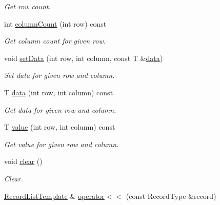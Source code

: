 \begin{DoxyCompactItemize}
\begin{DoxyCompactList}\small\item\em Get row count. \end{DoxyCompactList}\item 
int \hyperlink{class_mdt_1_1_plain_text_1_1_record_list_template_a59bfaf592d639840e2ce965b11185477}{column\+Count} (int row) const 
\begin{DoxyCompactList}\small\item\em Get column count for given row. \end{DoxyCompactList}\item 
void \hyperlink{class_mdt_1_1_plain_text_1_1_record_list_template_a53a8348c93099f99a8c53426c50e958b}{set\+Data} (int row, int column, const T \&\hyperlink{class_mdt_1_1_plain_text_1_1_record_list_template_a8bccf84419669f678d3f055d89fed002}{data})
\begin{DoxyCompactList}\small\item\em Set data for given row and column. \end{DoxyCompactList}\item 
T \hyperlink{class_mdt_1_1_plain_text_1_1_record_list_template_a8bccf84419669f678d3f055d89fed002}{data} (int row, int column) const 
\begin{DoxyCompactList}\small\item\em Get data for given row and column. \end{DoxyCompactList}\item 
T \hyperlink{class_mdt_1_1_plain_text_1_1_record_list_template_ac009f422a8f6b82f3633e2629c32ca52}{value} (int row, int column) const 
\begin{DoxyCompactList}\small\item\em Get value for given row and column. \end{DoxyCompactList}\item 
void \hyperlink{class_mdt_1_1_plain_text_1_1_record_list_template_aca9f27ea6367e4753dbcc07f457547b4}{clear} ()\hypertarget{class_mdt_1_1_plain_text_1_1_record_list_template_aca9f27ea6367e4753dbcc07f457547b4}{}\label{class_mdt_1_1_plain_text_1_1_record_list_template_aca9f27ea6367e4753dbcc07f457547b4}

\begin{DoxyCompactList}\small\item\em Clear. \end{DoxyCompactList}\item 
\hyperlink{class_mdt_1_1_plain_text_1_1_record_list_template}{Record\+List\+Template} \& \hyperlink{class_mdt_1_1_plain_text_1_1_record_list_template_a9e41a19aba8a50bbeabc0e1e76dd4b42}{operator$<$$<$} (const Record\+Type \&record)\hypertarget{class_mdt_1_1_plain_text_1_1_record_list_template_a9e41a19aba8a50bbeabc0e1e76dd4b42}{}\label{class_mdt_1_1_plain_text_1_1_record_list_template_a9e41a19aba8a50bbeabc0e1e76dd4b42}


\end{DoxyCompactItemize}

